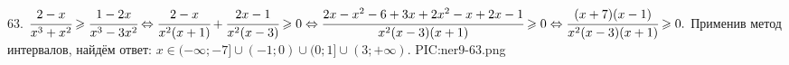 63. $\cfrac{2-x}{x^3+x^2}\geqslant\cfrac{1-2x}{x^3-3x^2}\Leftrightarrow\cfrac{2-x}{x^2(x+1)}+\cfrac{2x-1}{x^2(x-3)}\geqslant0\Leftrightarrow
\cfrac{2x-x^2-6+3x+2x^2-x+2x-1}{x^2(x-3)(x+1)}\geqslant0\Leftrightarrow\cfrac{(x+7)(x-1)}{x^2(x-3)(x+1)}\geqslant0.$ Применив метод интервалов, найдём ответ: $x\in
(-\infty;-7]\cup(-1;0)\cup(0;1]\cup(3;+\infty).$
{{PIC:ner9-63.png}}\newpage\noindent
